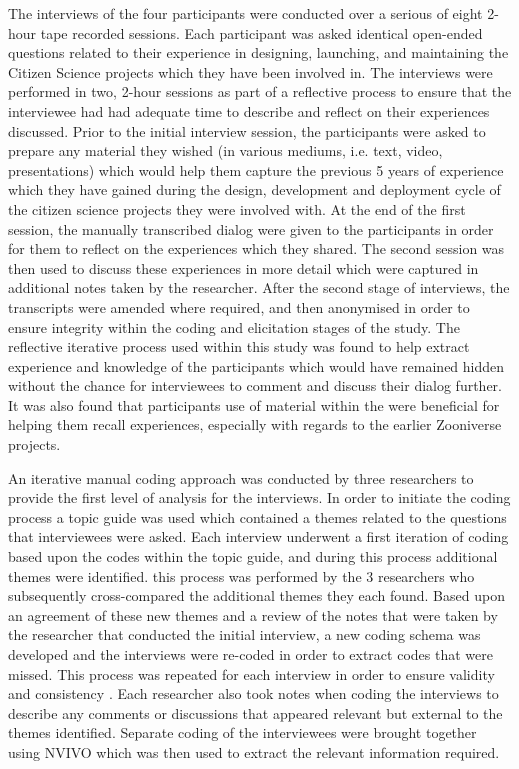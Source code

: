 \documentclass{sigchi}
\begin{document}
The interviews of the four participants were conducted over a serious of eight 2-hour tape recorded sessions. Each participant was asked identical open-ended questions related to their experience in designing, launching, and maintaining the Citizen Science projects which they have been involved in. The interviews were performed in two, 2-hour sessions as part of a reflective process to ensure that the interviewee had had adequate time to describe and reflect on their experiences discussed. Prior to the initial interview session, the participants were asked to prepare any material they wished (in various mediums, i.e. text, video, presentations) which would help them capture the previous 5 years of experience which they have gained during the design, development and deployment cycle of the citizen science projects they were involved with. At the end of the first session, the manually transcribed dialog were given to the participants in order for them to reflect on the experiences which they shared. The second session was then used to discuss these experiences in more detail which were captured in additional notes taken by the researcher. After the second stage of interviews, the transcripts were amended where required, and then anonymised in order to ensure integrity within the coding and elicitation stages of the study. The reflective iterative process used within this study was found to help extract experience and knowledge of the participants which would have remained hidden without the chance for interviewees to comment and discuss their dialog further. It was also found that participants use of material within the were beneficial for helping them recall experiences, especially with regards to the earlier Zooniverse projects.

An iterative manual coding approach was conducted by three researchers to provide the first level of analysis for the interviews. In order to initiate the coding process a topic guide was used which contained a themes related to the questions that interviewees were asked. Each interview underwent a first iteration of coding based upon the codes within the topic guide, and during this process additional themes were identified. this process was performed by the 3 researchers who subsequently cross-compared the additional themes they each found. Based upon an agreement of these new themes and a review of the notes that were taken by the researcher that conducted the initial interview, a new coding schema was developed and the interviews were re-coded in order to extract codes that were missed. This process was repeated for each interview in order to ensure validity and consistency \cite{Strauss1987} \cite{Lafaille1995}. Each researcher also took notes when coding the interviews to describe any comments or discussions that appeared relevant but external to the themes identified. Separate coding of the interviewees were brought together using NVIVO which was then used to extract the relevant information required.
\end{document}

